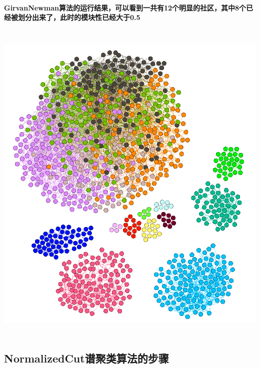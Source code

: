 \documentclass{ctexart}
\begin{document}
    \paragraph{GirvanNewman算法的运行结果，可以看到一共有12个明显的社区，其中8个已经被划分出来了，此时的模块性已经大于0.5}
    \begin{center}
        \includegraphics[height= 16cm] {GNCut2.png}
    \end{center}
    \subsection{NormalizedCut谱聚类算法的步骤}
\end{document}
